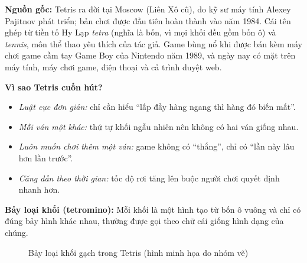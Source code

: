 \documentclass[a4paper]{article}
\newcommand{\tetro}[3]{\foreach \x/\y in {#1}{%
  \fill[#2,draw=black!55,line width=0.3pt] (\x*#3,\y*#3) rectangle ++(#3,#3);}}
\begin{document}
\textbf{Nguồn gốc:} Tetris ra đời tại Moscow (Liên Xô cũ), do kỹ sư máy tính Alexey Pajitnov phát triển; bản chơi được đầu tiên hoàn thành vào năm 1984. Cái tên ghép từ tiền tố Hy Lạp \emph{tetra} (nghĩa là bốn, vì mọi khối đều gồm bốn ô) và \emph{tennis}, môn thể thao yêu thích của tác giả. Game bùng nổ khi được bán kèm máy chơi game cầm tay Game Boy của Nintendo năm 1989, và ngày nay có mặt trên máy tính, máy chơi game, điện thoại và cả trình duyệt web.

\textbf{Vì sao Tetris cuốn hút?}
\begin{itemize}
  \item \emph{Luật cực đơn giản:} chỉ cần hiểu ``lấp đầy hàng ngang thì hàng đó biến mất''.
  \item \emph{Mỗi ván một khác:} thứ tự khối ngẫu nhiên nên không có hai ván giống nhau.
  \item \emph{Luôn muốn chơi thêm một ván:} game không có ``thắng'', chỉ có ``lần này lâu hơn lần trước''.
  \item \emph{Căng dần theo thời gian:} tốc độ rơi tăng lên buộc người chơi quyết định nhanh hơn.
\end{itemize}

\textbf{Bảy loại khối (tetromino):} Mỗi khối là một hình tạo từ bốn ô vuông và chỉ có đúng bảy hình khác nhau, thường được gọi theo chữ cái giống hình dạng của chúng.

\begin{figure}[H]
\centering
{}
\caption{Bảy loại khối gạch trong Tetris (hình minh họa do nhóm vẽ)}
\end{figure}
\end{document}
